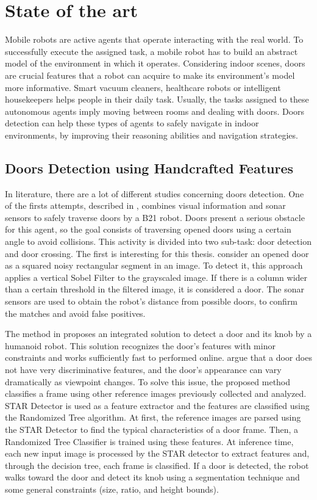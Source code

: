 \chapter{State of the art}
\label{capitolo2}
\thispagestyle{empty}

 Mobile robots are active agents that operate interacting with the real world. To successfully execute the assigned task, a mobile robot has to build an abstract model of the environment in which it operates. Considering indoor scenes, doors are crucial features that a robot can acquire to make its environment's model more informative. 
 Smart vacuum cleaners, healthcare robots or intelligent housekeepers helps people in their daily task. Usually, the tasks assigned to these autonomous agents imply moving between rooms and dealing with doors.
 Doors detection can help these types of agents to safely navigate in indoor environments, by improving their reasoning abilities and navigation strategies.
 
 \section{Doors Detection using Handcrafted Features}
  In literature, there are a lot of different studies concerning doors detection. One of the firsts attempts, described in \cite{sonarandivisualdoordetection}, combines visual information and sonar sensors to safely traverse doors by a B21 robot. Doors present a serious obstacle for this agent, so the goal consists of traversing opened doors using a certain angle to avoid collisions. This activity is divided into two sub-task: door detection and door crossing. The first is interesting for this thesis. \citeauthor{sonarandivisualdoordetection} consider an opened door as a squared noisy rectangular segment in an image. To detect it, this approach applies a vertical Sobel Filter to the grayscaled image. If there is a column wider than a certain threshold in the filtered image, it is considered a door. The sonar sensors are used to obtain the robot's distance from possible doors, to confirm the matches and avoid false positives. 
  
  The method in \cite{humanoid} proposes an integrated solution to detect a door and its knob by a humanoid robot. This solution recognizes the door's features with minor constraints and works sufficiently fast to performed online. \citeauthor{humanoid} argue that a door does not have very discriminative features, and the door's appearance can vary dramatically as viewpoint changes. To solve this issue, the proposed method classifies a frame using other reference images previously collected and analyzed. STAR Detector is used as a feature extractor and the features are classified using the Randomized Tree algorithm. At first, the reference images are parsed using the STAR Detector to find the typical characteristics of a door frame. Then, a Randomized Tree Classifier is trained using these features. At inference time, each new input image is processed by the STAR detector to extract features and, through the decision tree, each frame is classified. If a door is detected, the robot walks toward the door and detect its knob using a segmentation technique and some general constraints (size, ratio, and height bounds).
  
